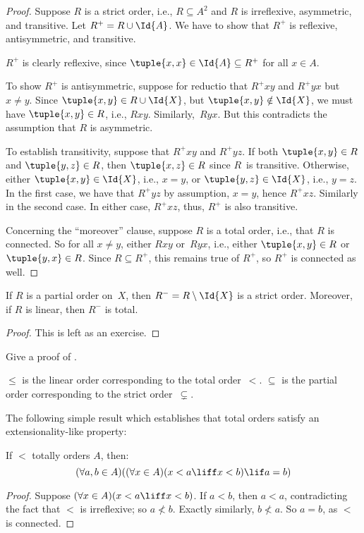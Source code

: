 \documentclass[../../../include/open-logic-section]{subfiles}
\begin{document}
\begin{proof}
Suppose $R$ is a strict order, i.e., $R \subseteq A^2$ and $R$ is
irreflexive, asymmetric, and transitive. Let $R^+ = R \cup \Id{A}$. We
have to show that $R^+$ is reflexive, antisymmetric, and transitive.

$R^+$ is clearly reflexive, since $\tuple{x, x} \in \Id{A} \subseteq
R^+$ for all $x \in A$. 

To show $R^+$ is antisymmetric, suppose for reductio that $R^+xy$ and
$R^+yx$ but $x \neq y$. Since $\tuple{x,y} \in R \cup \Id{X}$, but
$\tuple{x, y} \notin \Id{X}$, we must have $\tuple{x, y} \in R$, i.e.,
$Rxy$. Similarly,~$Ryx$. But this contradicts the assumption
that $R$ is asymmetric.

To establish transitivity, suppose that $R^+xy$ and $R^+yz$. If both
$\tuple{x, y} \in R$ and $\tuple{y,z} \in R$, then $\tuple{x, z} \in
R$ since $R$~is transitive. Otherwise, either $\tuple{x, y} \in
\Id{X}$, i.e., $x = y$, or $\tuple{y, z} \in \Id{X}$, i.e., $y = z$.
In the first case, we have that $R^+yz$ by assumption, $x = y$, hence
$R^+xz$. Similarly in the second case. In either case, $R^+xz$, thus,
$R^+$ is also transitive.

Concerning the ``moreover'' clause, suppose $R$ is a total order,
i.e., that $R$ is connected. So for all $x \neq y$, either $Rxy$
or~$Ryx$, i.e., either $\tuple{x, y} \in R$ or $\tuple{y, x} \in R$.
Since $R \subseteq R^+$, this remains true of $R^+$, so $R^+$ is
connected as well.
\end{proof}

\begin{prop}
If $R$ is a partial order on~$X$, then $R^- = R \setminus \Id{X}$ is a
strict order. Moreover, if $R$ is linear, then $R^-$ is total.
\end{prop}

\begin{proof}
This is left as an exercise.
\end{proof}

\begin{prob}
Give a proof of . 
\end{prob}

\begin{ex}
$\le$ is the linear order corresponding to the total 
order~$<$. $\subseteq$ is the partial order corresponding to
the strict order~$\subsetneq$.
\end{ex}

The following simple result which establishes that total orders
satisfy an extensionality-like property:

\begin{prop}
If $<$ totally orders $A$, then: 
\[
  (\forall a, b \in A)((\forall x \in A)(x < a \liff x < b) \lif a = b)
\]
\end{prop}

\begin{proof}
Suppose $(\forall x \in A)(x < a \liff x < b)$. If $a < b$, then $a <
a$, contradicting the fact that $<$ is irreflexive; so $a \nless b$.
Exactly similarly, $b \nless a$. So $a = b$, as $<$ is connected.
\end{proof}
\end{document}

